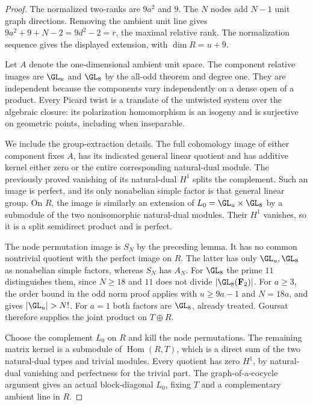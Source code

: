\begin{proof}
The normalized two-ranks are $9a^2$ and $9$. The $N$ nodes
add $N-1$ unit graph directions. Removing the ambient unit
line gives $9a^2+9+N-2=9d^2-2=r$, the maximal relative rank.
The normalization sequence gives the displayed extension,
with $\dim R=u+9$.

Let $A$ denote the one-dimensional ambient unit space.
The component relative images are $\GL_u$ and $\GL_8$ by
the all-odd theorem and degree one. They are independent
because the components vary independently on a dense open
of a product. Every Picard twist is a translate of the
untwisted system over the algebraic closure: its polarization
homomorphism is an isogeny and is surjective on geometric
points, including when inseparable.

We include the group-extraction details. The full cohomology
image of either component fixes $A$, has its indicated
general linear quotient and has additive kernel either
zero or the entire corresponding natural-dual module.
The previously proved vanishing of its natural-dual $H^1$
splits the complement. Such an image is perfect, and its
only nonabelian simple factor is that general linear group.
On $R$, the image is similarly an extension of
$L_0=\GL_u\times\GL_8$ by a submodule of the two
nonisomorphic natural-dual modules. Their $H^1$ vanishes,
so it is a split semidirect product and is perfect.

The node permutation image is $S_N$ by the preceding lemma.
It has no common nontrivial quotient with the perfect image
on $R$. The latter has only $\GL_u,\GL_8$ as nonabelian
simple factors, whereas $S_N$ has $A_N$. For $\GL_8$ the
prime $11$ distinguishes them, since $N\geq18$ and $11$
does not divide $|\GL_8(\mathbf F_2)|$. For $a\geq3$,
the order bound in the odd norm proof applies with
$u\geq9a-1$ and $N=18a$, and gives $|\GL_u|>N!$.
For $a=1$ both factors are $\GL_8$, already treated.
Goursat therefore supplies the joint product on $T\oplus R$.

Choose the complement $L_0$ on $R$ and kill the node
permutations. The remaining matrix kernel is a submodule
of $\operatorname{Hom}(R,T)$, which is a direct sum of
the two natural-dual types and trivial modules. Every
quotient has zero $H^1$, by natural-dual vanishing and
perfectness for the trivial part. The graph-of-a-cocycle
argument gives an actual block-diagonal $L_0$, fixing
$T$ and a complementary ambient line in $R$.


\end{proof}
